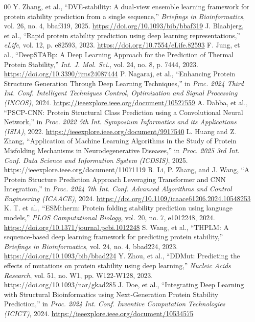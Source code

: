 \documentclass[conference]{IEEEtran}
\begin{document}
\begin{thebibliography}{00}
 Y. Zhang, et al., ``DVE-stability: A dual-view ensemble learning framework for protein stability prediction from a single sequence,'' \textit{Briefings in Bioinformatics}, vol. 26, no. 4, bbaf319, 2025. \url{https://doi.org/10.1093/bib/bbaf319}
 J. Blaabjerg, et al., ``Rapid protein stability prediction using deep learning representations,'' \textit{eLife}, vol. 12, p. e82593, 2023. \url{https://doi.org/10.7554/eLife.82593}
 F. Jung, et al., ``DeepSTABp: A Deep Learning Approach for the Prediction of Thermal Protein Stability,'' \textit{Int. J. Mol. Sci.}, vol. 24, no. 8, p. 7444, 2023. \url{https://doi.org/10.3390/ijms24087444}
 P. Nagaraj, et al., ``Enhancing Protein Structure Generation Through Deep Learning Techniques,'' in \textit{Proc. 2024 Third Int. Conf. Intelligent Techniques Control, Optimization and Signal Processing (INCOS)}, 2024. \url{https://ieeexplore.ieee.org/document/10527559}
 A. Dabba, et al., ``PSCP-CNN: Protein Structural Class Prediction using a Convolutional Neural Network,'' in \textit{Proc. 2022 5th Int. Symposium Informatics and its Applications (ISIA)}, 2022. \url{https://ieeexplore.ieee.org/document/9917540}
 L. Huang and Z. Zhang, ``Application of Machine Learning Algorithms in the Study of Protein Misfolding Mechanisms in Neurodegenerative Diseases,'' in \textit{Proc. 2025 3rd Int. Conf. Data Science and Information System (ICDSIS)}, 2025. \url{https://ieeexplore.ieee.org/document/11071119}
 R. Li, P. Zhang, and J. Wang, ``A Protein Structure Prediction Approach Leveraging Transformer and CNN Integration,'' in \textit{Proc. 2024 7th Int. Conf. Advanced Algorithms and Control Engineering (ICAACE)}, 2024. \url{https://doi.org/10.1109/icaace61206.2024.10548253}
 K. T. et al., ``ESMtherm: Protein folding stability prediction using language models,'' \textit{PLOS Computational Biology}, vol. 20, no. 7, e1012248, 2024. \url{https://doi.org/10.1371/journal.pcbi.1012248}
 S. Wang, et al., ``THPLM: A sequence-based deep learning framework for predicting protein stability,'' \textit{Briefings in Bioinformatics}, vol. 24, no. 4, bbad224, 2023. \url{https://doi.org/10.1093/bib/bbad224}
 Y. Zhou, et al., ``DDMut: Predicting the effects of mutations on protein stability using deep learning,'' \textit{Nucleic Acids Research}, vol. 51, no. W1, pp. W122-W128, 2023. \url{https://doi.org/10.1093/nar/gkad285}
 J. Doe, et al., ``Integrating Deep Learning with Structural Bioinformatics using Next-Generation Protein Stability Prediction,'' in \textit{Proc. 2024 Int. Conf. Inventive Computation Technologies (ICICT)}, 2024. \url{https://ieeexplore.ieee.org/document/10534575}

\end{thebibliography}
\end{document}
